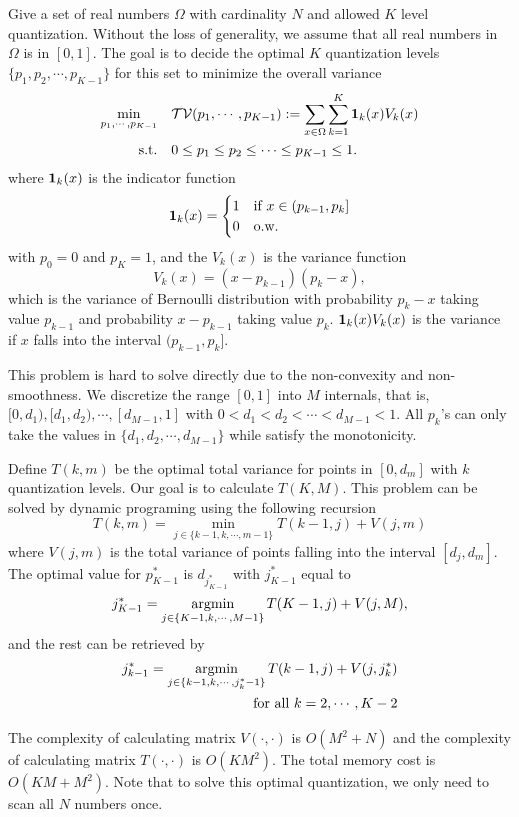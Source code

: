 Give a set of real numbers $\Omega$ with cardinality $N$ and allowed $K$ level quantization. Without the loss of generality, we assume that all real numbers in $\Omega$ is in $[0, 1]$. The goal is to decide the optimal $K$ quantization levels $\{p_1, p_2, \cdots, p_{K-1}\}$ for this set to minimize the overall variance
\begin{align}
\nonumber \min_{p_1, \cdots, p_{K-1}}\quad & \mathcal{TV}(p_1,\cdots, p_{K-1}) := \sum_{x\in \Omega} \sum_{k=1}^K {\bf 1}_k(x)V_k(x)\\
\text{s.t.}\quad & 0\leq p_1\leq p_2 \leq \cdots \leq p_{K-1} \leq 1.
\label{eq:opt_Q}
\end{align}
where ${\bf 1}_k(x)$ is the indicator function
\[
{\bf 1}_k(x) = 
\begin{cases}
1 & \text{if}~x\in (p_{k-1}, p_k] \\
0 & \text{o.w.}
\end{cases}
\]
with $p_0=0$ and $p_K=1$, and the $V_k(x)$ is the variance function 
\[
V_k(x) = (x-p_{k-1})(p_k - x), 
\]
which is the variance of Bernoulli distribution with probability $p_k-x$ taking value $p_{k-1}$ and probability $x-p_{k-1}$ taking value $p_k$. ${\bf 1}_k(x)V_k(x)$ is the variance if $x$ falls into the interval $(p_{k-1}, p_k]$. 

This problem is hard to solve directly due to the non-convexity and non-smoothness. We discretize the range $[0,1]$ into $M$ internals, that is, $[0,d_1), [d_1, d_2), \cdots, [d_{M-1}, 1]$ with $0< d_1<d_2<\cdots < d_{M-1}<1$. All $p_k$'s can only take the values in $\{d_1, d_2, \cdots, d_{M-1}\}$ while satisfy the monotonicity. 

Define $T(k, m)$ be the optimal total variance for points in $[0, d_m]$ with $k$ quantization levels. Our goal is to calculate $T(K, M)$. This problem can be solved by dynamic programing using the following recursion
\[
T(k, m) = \min_{j\in \{k-1, k, \cdots, m-1\}} T(k-1,j) + V(j,m)
\]
where $V(j,m)$ is the total variance of points falling into the interval $[d_j, d_m]$. The optimal value for $p_{K-1}^*$ is $ d_{j^*_{K-1}}$ with $j^*_{K-1}$ equal to
\[
j^*_{K-1} = \operatorname*{argmin}_{j\in \{K-1, k, \cdots, M-1\}} T(K-1,j) + V(j,M),
\]
and the rest can be retrieved by 
\begin{align*}
j^*_{k-1} = \operatorname*{argmin}_{j\in \{k-1, k, \cdots, j^*_k-1\}} T(k-1, j) + V(j, j^*_k) \\
\text{for all}~k=2, \cdots, K-2
\end{align*}

The complexity of calculating matrix $V(\cdot, \cdot)$ is $O(M^2 + N)$ and the complexity of calculating matrix $T(\cdot, \cdot)$ is $O(KM^2)$. The total memory cost is $O(KM + M^2)$. Note that to solve this optimal quantization, we only need to scan all $N$ numbers once.

